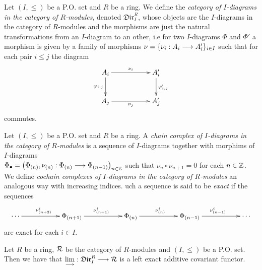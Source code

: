 \documentclass[11pt, a4paper, twoside]{article}
\begin{document}
\begin{defin}
Let $(I,\leq)$ be a P.O. set and $R$ be a ring. We define the \emph{category of $I$-diagrams in the category of $R$-modules}, denoted $\mathfrak{Dir}_I^R$, whose objects are the $I$-diagrams in the category of $R$-modules and the morphisms are just the natural transformations from an $I$-diagram to an other, i.e for two $I$-diagrams $\Phi$ and $\Phi'$ a morphism is given by a family of morphisms $\nu=\{\nu_i:A_i\longrightarrow A'_i\}_{i\in I}$ such that for each pair $i\leq j$ the diagram
\begin{displaymath}
    \xymatrix{
    A_i\ar[rr]^{\nu_i}\ar[d]_{\phi_{i,j}} & & A'_i\ar[d]^{\phi'_{i,j}}\\
    A_j\ar[rr]_{\nu_j} && A'_j
    }
\end{displaymath}
commutes.
\end{defin}
\begin{defin}
Let $(I,\leq)$ be a P.O. set and $R$ be a ring. A \emph{chain complex of $I$-diagrams in the category of $R$-modules} is a sequence of $I$-diagrams together with morphims of $I$-diagrams\\ $\Phi_{\bullet}=\big(\Phi_{(n)},\nu_{(n)}:\Phi_{(n)}\longrightarrow\Phi_{(n-1)}\big)_{n\in\mathbb{Z}}$ such that $\nu_n\circ\nu_{n+1}=0$ for each $n\in\mathbb{Z}$. We define \emph{cochain complexes of $I$-diagrams in the category of $R$-modules} an analogous way with increasing indices. uch a sequence is said to be \emph{exact} if the sequences 
\begin{displaymath}
    \xymatrix{
        \cdots\ar[rr]^{\nu^{i}_{(n+2)}} & & \Phi_{(n+1)}\ar[rr]^{\nu^{i}_{(n+1)}} & & \Phi_{(n)}\ar[rr]^{\nu^{i}_{(n)}} & & \Phi_{(n-1)}\ar[rr]^{\nu^{i}_{(n-1)}} & & \cdots
    }
\end{displaymath}
are exact for each $i\in I$.
\end{defin}
\begin{thm}
Let $R$ be a ring, $\mathcal{R}$ be the category of $R$-modules and $(I,\leq)$ be a P.O. set.\\
Then we have that $\lim\limits_{\longrightarrow}:\mathfrak{Dir}^R_I\longrightarrow\mathcal{R}$ is a left exact additive covariant functor. 
\end{thm}
\end{document}
